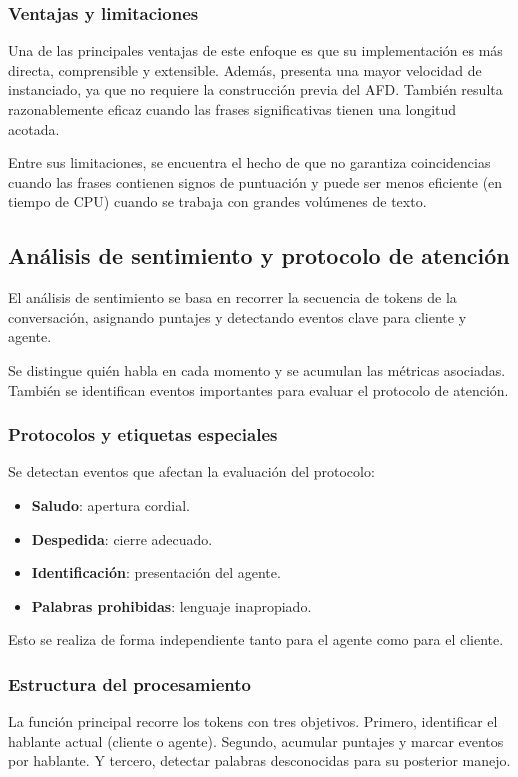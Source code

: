 \subsubsection{Ventajas y limitaciones}
Una de las principales ventajas de este enfoque es que su implementación es más directa,
comprensible y extensible. Además, presenta una mayor velocidad de instanciado, ya que no
requiere la construcción previa del AFD. También resulta razonablemente eficaz cuando las
frases significativas tienen una longitud acotada.

Entre sus limitaciones, se encuentra el hecho de que no garantiza coincidencias cuando las
frases contienen signos de puntuación y puede ser menos eficiente (en tiempo de CPU) cuando se
trabaja con grandes volúmenes de texto.

\subsection{Análisis de sentimiento y protocolo de atención}
El análisis de sentimiento se basa en recorrer la secuencia de tokens de la conversación,
asignando puntajes y detectando eventos clave para cliente y agente.

Se distingue quién habla en cada momento y se acumulan las métricas asociadas. También se
identifican eventos importantes para evaluar el protocolo de atención.

\subsubsection{Protocolos y etiquetas especiales}
Se detectan eventos que afectan la evaluación del protocolo:

\begin{itemize}
	\item \textbf{Saludo}: apertura cordial.
	\item \textbf{Despedida}: cierre adecuado.
	\item \textbf{Identificación}: presentación del agente.
	\item \textbf{Palabras prohibidas}: lenguaje inapropiado.
\end{itemize}

Esto se realiza de forma independiente tanto para el agente como para el cliente.

\subsubsection{Estructura del procesamiento}
La función principal recorre los tokens con tres objetivos. Primero, identificar el hablante
actual (cliente o agente). Segundo, acumular puntajes y marcar eventos por hablante. Y tercero,
detectar palabras desconocidas para su posterior manejo.

